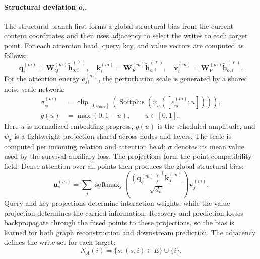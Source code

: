 \paragraph{Structural deviation $\mathbf o_i$.}
The structural branch first forms a global structural bias from the current
content coordinates and then uses adjacency to select the writes to each target
point.  For each attention head, query, key, and value vectors are computed as
follows:
\begin{equation}
\mathbf q_i^{(m)}=\mathbf W_Q^{(m)}\widetilde{\mathbf h}_{o,i}^{(\ell)},\quad
\mathbf k_i^{(m)}=\mathbf W_K^{(m)}\widetilde{\mathbf h}_{o,i}^{(\ell)},\quad
\mathbf v_i^{(m)}=\mathbf W_V^{(m)}\widetilde{\mathbf h}_{o,i}^{(\ell)}.
\label{eq:qkv}
\end{equation}
For the attention energy $e_{si}^{(m)}$, the perturbation scale is generated by
a shared noise-scale network:
\begin{equation}
 \begin{aligned}
 \sigma_{si}^{(m)}&=\operatorname{clip}_{[0,\sigma_{\max}]}
 \left(\operatorname{Softplus}\left(\psi_\sigma([e_{si}^{(m)};u])\right)\right),\\
 g(u)&=\max(0,1-u),\qquad u\in[0,1].
 \end{aligned}
 \label{eq:noise-scale}
\end{equation}
Here $u$ is normalized embedding progress, $g(u)$ is the scheduled amplitude,
and $\psi_\sigma$ is a lightweight projection shared across nodes and layers.
The scale is computed per incoming relation and attention head; $\bar\sigma$
denotes its mean value used by the survival auxiliary loss.
The projections form the point compatibility field.  Dense attention over all
points then produces the global structural bias:
\begin{equation}
\mathbf u_s^{(m)}=\sum_j\operatorname{softmax}_j\!\left(
\frac{(\mathbf q_s^{(m)})^\top\mathbf k_j^{(m)}}{\sqrt{d_h}}\right)
\mathbf v_j^{(m)}.
\label{eq:source-summary}
\end{equation}
Query and key projections determine interaction weights, while the value
projection determines the carried information.  Recovery and prediction losses
backpropagate through the fused points to these projections, so the bias is
learned for both graph reconstruction and downstream prediction.
The adjacency defines the write set for each target:
\begin{equation}
 N_A(i)=\{s:(s,i)\in E\}\cup\{i\}.
 \label{eq:write-set}
\end{equation}
